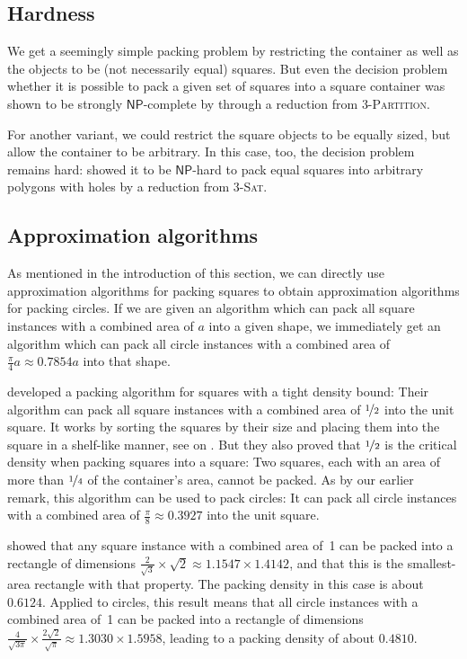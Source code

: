\documentclass[a4paper,style=print,bibliography=totoc,nexus,lnum,extramargin]{tubsbook}
\begin{document}
\subsection{Hardness}

We get a seemingly simple packing problem by restricting the container as well as the objects to be (not necessarily equal) squares.
But even the decision problem whether it is possible to pack a given set of squares into a square container was shown to be strongly $\mathsf{NP}$-complete by \textcite{LTWYC1990packing} through a reduction from \textsc{3-Partition}.

For another variant, we could restrict the square objects to be equally sized, but allow the container to be arbitrary.
In this case, too, the decision problem remains hard:
\textcite{FPT1981optimal} showed it to be $\mathsf{NP}$-hard to pack equal squares into arbitrary polygons with holes by a reduction from \textsc{3-Sat}.

\subsection{Approximation algorithms}

As mentioned in the introduction of this section, we can directly use approximation algorithms for packing squares to obtain approximation algorithms for packing circles.
If we are given an algorithm which can pack all square instances with a combined area of $a$ into a given shape, we immediately get an algorithm which can pack all circle instances with a combined area of $\frac{\pi}{4}a \approx 0.7854a$ into that shape. 

\textcite{MM1967some} developed a packing algorithm for squares with a tight density bound: Their algorithm can pack all square instances with a combined area of $\nicefrac{1}{2}$ into the unit square.
It works by sorting the squares by their size and placing them into the square in a shelf-like manner, see  on .
But they also proved that $\nicefrac{1}{2}$ is the critical density when packing squares into a square: Two squares, each with an area of more than $\nicefrac{1}{4}$ of the container's area, cannot be packed.
As by our earlier remark, this algorithm can be used to pack circles: It can pack all circle instances with a combined area of $\frac{\pi}{8} \approx 0.3927$ into the unit square.

\textcite{KK1975optimal} showed that any square instance with a combined area of~1 can be packed into a rectangle of dimensions $\frac{2}{\sqrt{3}} \times \sqrt{2} \approx 1.1547 \times 1.4142$, and that this is the smallest-area rectangle with that property. The packing density in this case is about $0.6124$. Applied to circles, this result means that all circle instances with a combined area of~1 can be packed into a rectangle of dimensions $\frac{4}{\sqrt{3\pi}} \times \frac{2\sqrt{2}}{\sqrt{\pi}} \approx 1.3030 \times 1.5958$, leading to a packing density of about $0.4810$.
\end{document}
